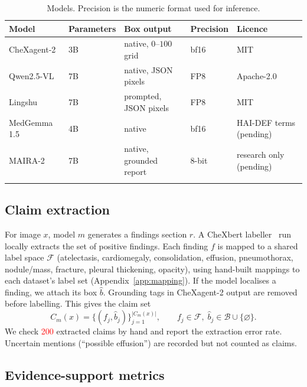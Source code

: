 \documentclass[pdflatex,sn-mathphys-num]{sn-jnl}
\newcommand{\tbd}[1][TBD]{\textcolor{red}{#1}}   %
\theoremstyle{thmstyleone}
\begin{document}
\begin{table}[t]
\caption{Models. Precision is the numeric format used for inference.}\label{tab:models}
\centering
\footnotesize
\begin{tabular}{@{}lllll@{}}
\toprule
Model & Parameters & Box output & Precision & Licence \\
\midrule
CheXagent-2~\cite{chexagent} & 3B & native, $0$--$100$ grid & bf16 & MIT \\
Qwen2.5-VL~\cite{qwen25vl} & 7B & native, JSON pixels & FP8 & Apache-2.0 \\
Lingshu~\cite{lingshu} & 7B & prompted, JSON pixels & FP8 & MIT \\
MedGemma 1.5~\cite{medgemma15} & 4B & native & bf16 & HAI-DEF terms (pending) \\
MAIRA-2~\cite{maira2} & 7B & native, grounded report & 8-bit & research only (pending) \\
\botrule
\end{tabular}
\end{table}

\subsection{Claim extraction}\label{sec:claims}

For image $x$, model $m$ generates a findings section $r$. A CheXbert labeller~\cite{chexbert} run locally extracts the set of positive findings. Each finding $f$ is mapped to a shared label space $\mathcal{F}$ (atelectasis, cardiomegaly, consolidation, effusion, pneumothorax, nodule/mass, fracture, pleural thickening, opacity), using hand-built mappings to each dataset's label set (Appendix~\ref{app:mapping}). If the model localises a finding, we attach its box $\hat b$. Grounding tags in CheXagent-2 output are removed before labelling. This gives the claim set
\begin{equation}
C_m(x) = \{(f_j, \hat b_j)\}_{j=1}^{|C_m(x)|}, \qquad f_j \in \mathcal{F},\; \hat b_j \in \mathcal{B}\cup\{\varnothing\}.
\end{equation}
We check \tbd[200] extracted claims by hand and report the extraction error rate. Uncertain mentions (``possible effusion'') are recorded but not counted as claims.

\subsection{Evidence-support metrics}\label{sec:metrics}
\end{document}
